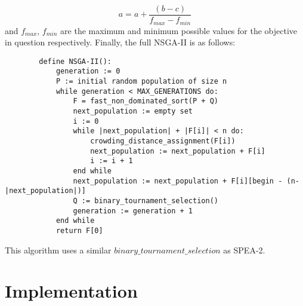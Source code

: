 \documentclass{article}
\begin{document}
    \begin{equation*}
        a = a + \dfrac{(b - c)}{f_{max} - f_{min}}
    \end{equation*}
    and \(f_{max}\), \(f_{min}\) are the maximum and minimum possible values for the objective in question respectively. 
    Finally, the full NSGA-II is as follows:
    \begin{lstlisting}
        define NSGA-II():
            generation := 0
            P := initial random population of size n
            while generation < MAX_GENERATIONS do:
                F = fast_non_dominated_sort(P + Q)
                next_population := empty set
                i := 0
                while |next_population| + |F[i]| < n do:
                    crowding_distance_assignment(F[i])
                    next_population := next_population + F[i]
                    i := i + 1
                end while
                next_population := next_population + F[i][begin - (n-|next_population|)]
                Q := binary_tournament_selection()
                generation := generation + 1
            end while
            return F[0]
    \end{lstlisting}
    This algorithm uses a similar \(binary\_tournament\_selection\) as SPEA-2.
    \cite{DebPratapAgarwalMeyarivan} \cite{PonsichJaimesCoello}
    \section{Implementation}
\end{document}
